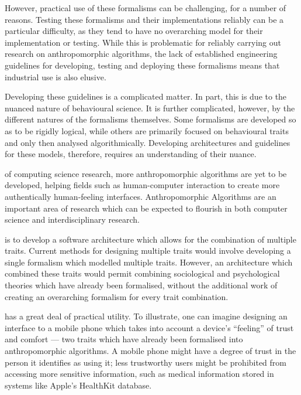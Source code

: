 However, practical use of these formalisms can be challenging, for a number of reasons. Testing these formalisms and their implementations reliably can be a particular difficulty, as they tend to have no overarching model for their implementation or testing\cite{Chandrasekaran2011}. While this is problematic for reliably carrying out research on anthropomorphic algorithms, the lack of established engineering guidelines for developing, testing and deploying these formalisms means that industrial use is also elusive.\par

Developing these guidelines is a complicated matter. In part, this is due to the nuanced nature of behavioural science. It is further complicated, however, by the different natures of the formalisms themselves. Some formalisms are developed so as to be rigidly logical\cite{Castelfranchi}, while others are primarily focused on behavioural traits and only then analysed algorithmically\cite{marsh1994}. Developing architectures and guidelines for these models, therefore, requires an understanding of their nuance.\par

 of computing science research, more anthropomorphic algorithms are yet to be developed, helping fields such as human-computer interaction to create more authentically human-feeling interfaces. Anthropomorphic Algorithms are an important area of research which can be expected to flourish in both computer science and interdisciplinary research.\par

\bigskip %

 is to develop a software architecture which allows for the combination of multiple traits. Current methods for designing multiple traits would involve developing a single formalism which modelled multiple traits. However, an architecture which combined these traits would permit combining sociological and psychological theories which have already been formalised, without the additional work of creating an overarching formalism for every trait combination.

 has a great deal of practical utility. To illustrate, one can imagine designing an interface to a mobile phone which takes into account a device's ``feeling'' of trust and comfort --- two traits which have already been formalised into anthropomorphic algorithms.\cite{Marsh2011, marsh1994} A mobile phone might have a degree of trust in the person it identifies as using it; less trustworthy users might be prohibited from accessing more sensitive information, such as medical information stored in systems like Apple's HealthKit database.\par

